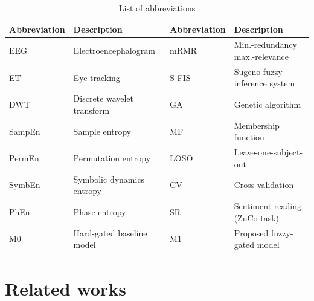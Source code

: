 \documentclass[11pt,a4paper]{article}
\begin{document}
\begin{table}[t]
\centering\small
\caption{List of abbreviations}\label{tab:abbr}
\begin{tabular}{@{}ll@{\hspace{2em}}ll@{}}
\toprule
Abbreviation & Description & Abbreviation & Description\\
\midrule
EEG & Electroencephalogram & mRMR & Min.-redundancy max.-relevance\\
ET & Eye tracking & S-FIS & Sugeno fuzzy inference system\\
DWT & Discrete wavelet transform & GA & Genetic algorithm\\
SampEn & Sample entropy & MF & Membership function\\
PermEn & Permutation entropy & LOSO & Leave-one-subject-out\\
SymbEn & Symbolic dynamics entropy & CV & Cross-validation\\
PhEn & Phase entropy & SR & Sentiment reading (ZuCo task)\\
M0 & Hard-gated baseline model & M1 & Proposed fuzzy-gated model\\
\bottomrule
\end{tabular}
\end{table}

\section{Related works}
\label{sec:related}
\end{document}

